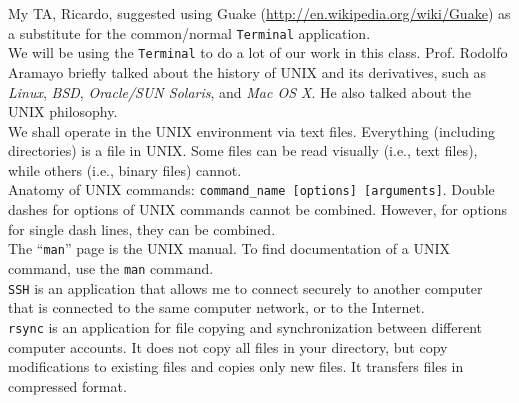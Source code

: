 My TA, Ricardo, suggested using Guake (\url{http://en.wikipedia.org/wiki/Guake}) as a substitute for the common/normal {\tt Terminal} application. \\

We will be using the {\tt Terminal} to do a lot of our work in this class. Prof. Rodolfo Aramayo briefly talked about the history of UNIX and its derivatives, such as {\it Linux}, {\it BSD}, {\it Oracle/SUN Solaris}, and {\it Mac OS X}. He also talked about the UNIX philosophy. \\

We shall operate in the UNIX environment via text files. Everything (including directories) is a file in UNIX. Some files can be read visually (i.e., text files), while others (i.e., binary files) cannot. \\

Anatomy of UNIX commands: {\tt command\_name [options] [arguments]}. Double dashes for options of UNIX commands cannot be combined. However, for options for single dash lines, they can be combined. \\

The ``{\tt man}'' page is the UNIX manual. To find documentation of a UNIX command, use the {\tt man} command. \\

{\tt SSH} is an application that allows me to connect securely to another computer that is connected to the same computer network, or to the Internet. \\

{\tt rsync} is an application for file copying and synchronization between different computer accounts. It does not copy all files in your directory, but copy modifications to existing files and copies only new files. It transfers files in compressed format. \\




